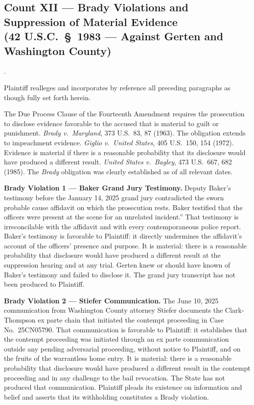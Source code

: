 \documentclass[12pt,letterpaper]{article}
\newcounter{complaintpara}
\newenvironment{paras}{%
	\begin{list}{\arabic{complaintpara}.}{%
			\setlength{\leftmargin}{0.5in}%
			\setlength{\labelwidth}{0.4in}%
			\setlength{\labelsep}{0.1in}%
			\setlength{\itemsep}{0pt}%
			\setlength{\parsep}{0pt}%
			\setlength{\topsep}{6pt}%
		}%
	}{%
	\end{list}%
}
\begin{document}
	\subsection*{Count XII --- Brady Violations and Suppression of Material Evidence\\
		(42 U.S.C.\ \S\ 1983 --- Against Gerten and Washington County)}
	\begin{paras}
		
		\item Plaintiff realleges and incorporates by reference all
		preceding paragraphs as though fully set forth herein.
		
		\item The Due Process Clause of the Fourteenth Amendment
		requires the prosecution to disclose evidence favorable to
		the accused that is material to guilt or punishment.
		\textit{Brady v.\ Maryland}, 373 U.S.\ 83, 87 (1963).
		The obligation extends to impeachment evidence.
		\textit{Giglio v.\ United States}, 405 U.S.\ 150, 154 (1972).
		Evidence is material if there is a reasonable probability
		that its disclosure would have produced a different result.
		\textit{United States v.\ Bagley}, 473 U.S.\ 667, 682 (1985).
		The \textit{Brady} obligation was clearly established as of
		all relevant dates.
		
		\item \textbf{Brady Violation 1 --- Baker Grand Jury Testimony.}
		Deputy Baker's testimony before the January 14, 2025 grand
		jury contradicted the sworn probable cause affidavit on which
		the prosecution rests. Baker testified that the officers were
		present at the scene for an unrelated incident.'' That
		testimony is irreconcilable with the affidavit and with every
		contemporaneous police report. Baker's testimony is
		favorable to Plaintiff: it directly undermines the
		affidavit's account of the officers' presence and purpose.
		It is material: there is a reasonable probability that
		disclosure would have produced a different result at the
		suppression hearing and at any trial. Gerten knew or should
		have known of Baker's testimony and failed to disclose it.
		The grand jury transcript has not been produced to Plaintiff.
		
		\item \textbf{Brady Violation 2 --- Stiefer Communication.}
		The June 10, 2025 communication from Washington County
		attorney Stiefer documents the Clark-Thompson ex parte chain
		that initiated the contempt proceeding in Case
		No.\ 25CN05790. That communication is favorable to
		Plaintiff: it establishes that the contempt proceeding was
		initiated through an ex parte communication outside any
		pending adversarial proceeding, without notice to Plaintiff,
		and on the fruits of the warrantless home entry. It is
		material: there is a reasonable probability that disclosure
		would have produced a different result in the contempt
		proceeding and in any challenge to the bail revocation. The
		State has not produced that communication. Plaintiff pleads
		its existence on information and belief and asserts that its
		withholding constitutes a Brady violation.
		

\end{paras}
\end{document}
